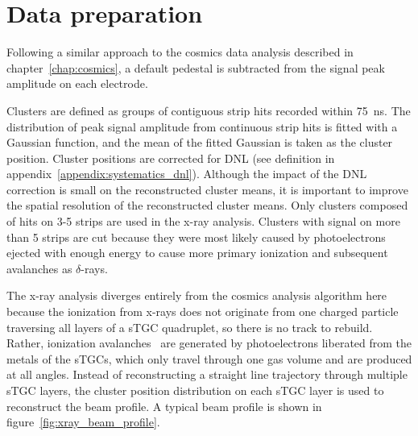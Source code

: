 \section{Data preparation}

Following a similar approach to the cosmics data analysis described in chapter~\ref{chap:cosmics}, a default pedestal is subtracted from the signal peak amplitude on each electrode.

Clusters are defined as groups of contiguous strip hits recorded within \SI{75}{ns}. The distribution of peak signal amplitude from continuous strip hits is fitted with a Gaussian function, and the mean of the fitted Gaussian is taken as the cluster position. Cluster positions are corrected for DNL (see definition in appendix~\ref{appendix:systematics_dnl}). Although the impact of the DNL correction is small on the reconstructed cluster means, it is important to improve the spatial resolution of the reconstructed cluster means. Only clusters composed of hits on 3-5 strips are used in the x-ray analysis. Clusters with signal on more than 5 strips are cut because they were most likely caused by photoelectrons ejected with enough energy to cause more primary ionization and subsequent avalanches as $\delta$-rays.

The x-ray analysis diverges entirely from the cosmics analysis algorithm here because the ionization from x-rays does not originate from one charged particle traversing all layers of a sTGC quadruplet, so there is no track to rebuild. Rather, ionization avalanches~\cite{townsend_electricity_1915} are generated by photoelectrons liberated from the metals of the sTGCs, which only travel through one gas volume and are produced at all angles. Instead of reconstructing a straight line trajectory through multiple sTGC layers, the cluster position distribution on each sTGC layer is used to reconstruct the beam profile. A typical beam profile is shown in figure~\ref{fig:xray_beam_profile}.

